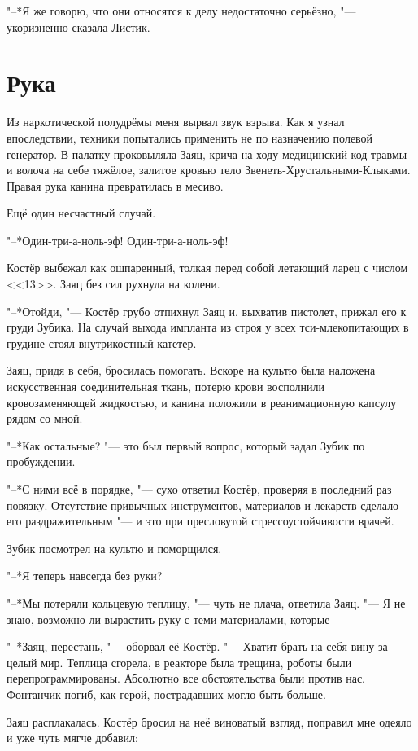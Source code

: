 \documentclass[a4paper,10pt,fleqn]{book}
\newcommand{\ldotst}{\so{...}\xspace}
\begin{document}
"--*Я же говорю, что они относятся к делу недостаточно серьёзно, "--- укоризненно сказала Листик.

\section{Рука}

Из наркотической полудрёмы меня вырвал звук взрыва.
Как я узнал впоследствии, техники попытались применить не по назначению полевой генератор.
В палатку проковыляла Заяц, крича на ходу медицинский код травмы и волоча на себе тяжёлое, залитое кровью тело Звенеть-Хрустальными-Клыками.
Правая рука канина превратилась в месиво.

Ещё один несчастный случай.

"--*Один-три-а-ноль-эф!
Один-три-а-ноль-эф!

Костёр выбежал как ошпаренный, толкая перед собой летающий ларец с числом <<13>>.
Заяц без сил рухнула на колени.

"--*Отойди, "--- Костёр грубо отпихнул Заяц и, выхватив пистолет, прижал его к груди Зубика.
На случай выхода импланта из строя у всех тси-млекопитающих в грудине стоял внутрикостный катетер.

Заяц, придя в себя, бросилась помогать.
Вскоре на культю была наложена искусственная соединительная ткань, потерю крови восполнили кровозаменяющей жидкостью, и канина положили в реанимационную капсулу рядом со мной.

"--*Как остальные? "--- это был первый вопрос, который задал Зубик по пробуждении.

"--*С ними всё в порядке, "--- сухо ответил Костёр, проверяя в последний раз повязку.
Отсутствие привычных инструментов, материалов и лекарств сделало его раздражительным "--- и это при пресловутой стрессоустойчивости врачей.

Зубик посмотрел на культю и поморщился.

"--*Я теперь навсегда без руки?

"--*Мы потеряли кольцевую теплицу, "--- чуть не плача, ответила Заяц.
"--- Я не знаю, возможно ли вырастить руку с теми материалами, которые\ldotst

"--*Заяц, перестань, "--- оборвал её Костёр.
"--- Хватит брать на себя вину за целый мир.
Теплица сгорела, в реакторе была трещина, роботы были перепрограммированы.
Абсолютно все обстоятельства были против нас.
Фонтанчик погиб, как герой, пострадавших могло быть больше.

Заяц расплакалась.
Костёр бросил на неё виноватый взгляд, поправил мне одеяло и уже чуть мягче добавил:
\end{document}

